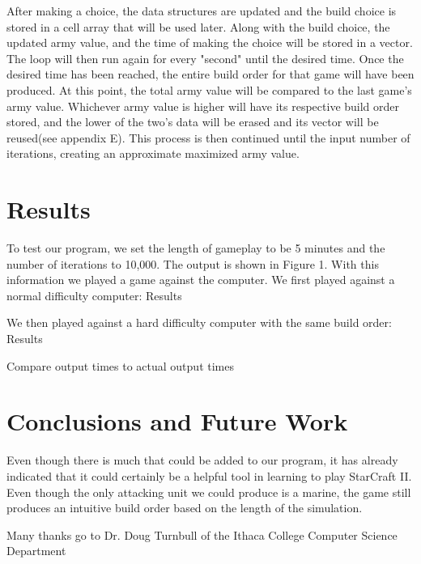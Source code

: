 \documentclass[prb,twocolumn]{revtex4}
\begin{document}
After making a choice, the data structures are updated and the build choice is stored in a cell array that will be used later.  Along with the build choice, the updated army value, and the time of making the choice will be stored in a vector.  The loop will then run again for every "second" until the desired time.  Once the desired time has been reached, the entire build order for that game will have been produced.  At this point, the total army value will be compared to the last game's army value.  Whichever army value is higher will have its respective build order stored, and the lower of the two's data will be erased and its vector will be reused(see appendix E).  This process is then continued until the input number of iterations, creating an approximate maximized army value.



\section{Results}

To test our program, we set the length of gameplay to be 5 minutes and the number of iterations to 10,000.  The output is shown in Figure 1.  With this information we played a game against the computer.  We first played against a normal difficulty computer:  Results

We then played against a hard difficulty computer with the same build order:  Results

Compare output times to actual output times




\section{Conclusions and Future Work}
Even though there is much that could be added to our program, it has already indicated that it could certainly be a helpful tool in learning to play StarCraft II.  Even though the only attacking unit we could produce is a marine, the game still produces an intuitive build order based on the length of the simulation.  








\begin{acknowledgments}
Many thanks go to Dr. Doug Turnbull of the Ithaca College Computer Science Department
\end{acknowledgments}
\end{document}
